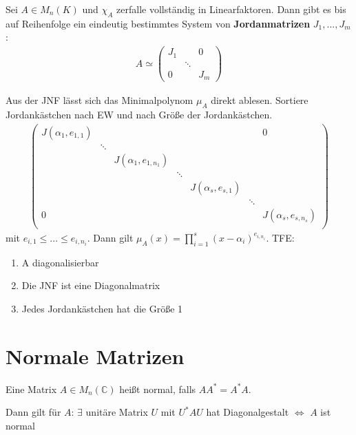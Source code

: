 \begin{theorem}
Sei $A \in M_n(K)$ und $\chi_A$ zerfalle vollständig in Linearfaktoren. Dann gibt es bis auf Reihenfolge ein eindeutig bestimmtes System von \textbf{Jordanmatrizen} $J_1,...,J_m$:
\begin{align*}
A \simeq 
\begin{pmatrix}
J_1 & & 0\\
    & \ddots & \\
0   &        & J_m
\end{pmatrix}
\end{align*}
\end{theorem}
\begin{remark}
Aus der JNF lässt sich das Minimalpolynom $\mu_A$ direkt ablesen. Sortiere Jordankästchen nach EW und nach Größe der Jordankästchen.
\begin{align*}
\begin{pmatrix}
J(\alpha_1,e_{1,1}) & & & & & & 0\\
& \ddots & & & & & \\
 & & J(\alpha_1,e_{1,n_1}) & & & & \\
 & & & \ddots & & & \\
 & & & & J(\alpha_s,e_{s,1}) & &\\
 & & & & & \ddots & \\
0 & & & & & & J(\alpha_s,e_{s,n_s}) \\
\end{pmatrix}
\end{align*}
mit $e_{i,1} \leq ... \leq e_{i,n_i}$. Dann gilt $\mu_A(x)=\prod \limits_{i=1}^s (x-\alpha_i)^{e_{i,n_i}}$. TFE:
\begin{enumerate}
	\item A diagonalisierbar
	\item Die JNF ist eine Diagonalmatrix
	\item Jedes Jordankästchen hat die Größe 1
\end{enumerate}
\end{remark}

\section{Normale Matrizen}
\begin{definition}
Eine Matrix $A \in M_n(\mathbb{C})$ heißt normal, falls $AA^* = A^*A$.
\end{definition}
\begin{lemma}
Dann gilt für $A$: $\exists$ unitäre Matrix $U$ mit $U^*AU$ hat Diagonalgestalt $\Leftrightarrow$ $A$ ist normal
\end{lemma}

